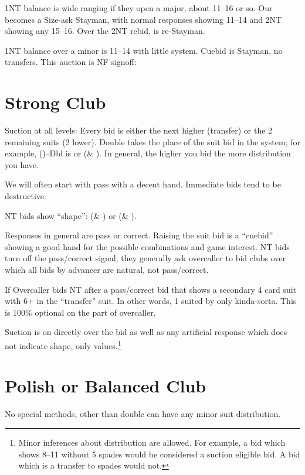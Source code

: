 \documentclass[tom-ari]{subfile}
\begin{document}
	1NT balance is wide ranging if they open a major, about 11--16 or so. Our  becomes a Size-ask Stayman, with normal responses showing 11--14 and 2NT showing any 15--16. Over the 2NT rebid,  is re-Stayman.
	
	1NT balance over a minor is 11--14 with little system. Cuebid is Stayman, no transfers. This auction is NF signoff:
	
	
	\section{Strong Club}
	
	Suction at all levels: Every bid is either the next higher (transfer) or the 2 remaining suits (2 lower). Double takes the place of the suit bid in the system; for example, ()--Dbl is \diamondsuit or (\heartsuit \& \spadesuit). In general, the higher you bid the more distribution you have. 
	
	We will often start with pass with a decent hand. Immediate bids tend to be destructive.
	
	NT bids show ``shape'': (\diamondsuit \& \spadesuit) or (\clubsuit \& \heartsuit).
	
	Responses in general are pass or correct. Raising the suit bid is a ``cuebid'' showing a good hand for the possible combinations and game interest. NT bids turn off the pass/correct signal; they generally ask overcaller to bid clubs over which all bids by advancer are natural, not pass/correct.
	
	If Overcaller bids NT after a pass/correct bid that shows a secondary 4 card suit with 6+ in the ``transfer'' suit. In other words, 1 suited by only kinda-sorta. This is 100\% optional on the part of overcaller.
	
	Suction is on directly over the  bid as well as any artificial response which does not indicate shape, only values.\footnote{Minor inferences about distribution are allowed. For example, a  bid which shows 8--11 without 5 spades would be considered a suction eligible bid. A  bid which is a transfer to spades would not.}
	
	\section{Polish or Balanced Club}
	
	No special methods, other than double can have any minor suit distribution.
	
\end{document}
